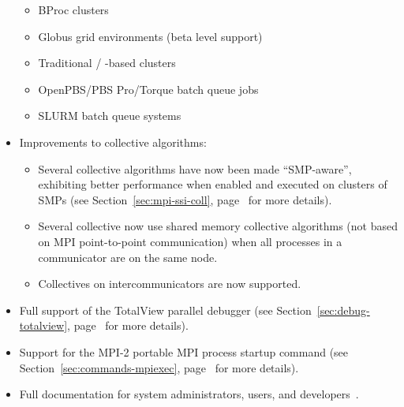 \begin{itemize}
  \begin{itemize}
  \item BProc clusters
  \item Globus grid environments (beta level support)
  \item Traditional  / -based clusters
  \item OpenPBS/PBS Pro/Torque batch queue jobs
  \item SLURM batch queue systems
  \end{itemize}


\item Improvements to collective algorithms:

  \begin{itemize}
  \item Several collective algorithms have now been made
    ``SMP-aware'', exhibiting better performance when enabled and
    executed on clusters of SMPs (see Section~\ref{sec:mpi-ssi-coll},
    page~\pageref{sec:mpi-ssi-coll} for more details).

  \item Several collective now use shared memory collective algorithms
    (not based on MPI point-to-point communication) when all processes
    in a communicator are on the same node.
    
  \item Collectives on intercommunicators are now supported.
  \end{itemize}
  

\item Full support of the TotalView parallel debugger (see
  Section~\ref{sec:debug-totalview},
  page~\pageref{sec:debug-totalview} for more details).
  
\item Support for the MPI-2 portable MPI process startup command
   (see Section~\ref{sec:commands-mpiexec},
  page~\pageref{sec:commands-mpiexec} for more details).
  
\item Full documentation for system administrators, users, and
  developers~\cite{sankaran03:_check_restar_suppor_system_servic,squyres03:_boot_system_servic_inter_ssi,squyres03:_mpi_collec_operat_system_servic,squyres03:_reques_progr_inter_rpi_system,squyres03:_system_servic_inter_ssi_lam_mpi,lamteam03:_lam_mpi_install_guide,lamteam03:_lam_mpi_user_guide}.
  

\end{itemize}
